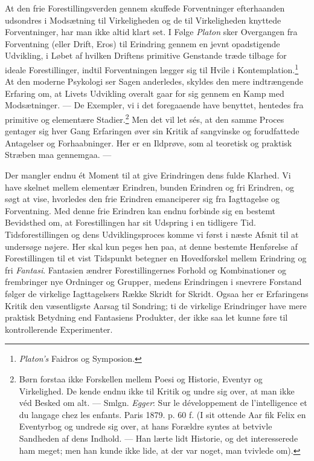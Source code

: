 \documentclass[12pt,a4paper,openany]{book}
\newcommand{\opage}[1]{\marginnote{\footnotesize\textit{[#1]}}}
\begin{document}
At den frie Forestillingsverden gennem skuffede Forventninger
efterhaanden udsondres i Modsætning til Virkeligheden og de til
Virkeligheden knyttede Forventninger, har man ikke altid klart set. I
Følge \emph{Platon} sker Overgangen fra Forventning (eller Drift, Eros)
til Erindring gennem en jevnt opadstigende Udvikling, i Løbet af hvilken
Driftens primitive Genstande træde tilbage for ideale Forestillinger,
indtil Forventningen lægger sig til Hvile i
Kontemplation.\footnote[1]{\emph{Platon’s} Faidros og Symposion.} At den
moderne Psykologi ser Sagen anderledes, skyldes den mere indtrængende
Erfaring om, at Livets Udvikling overalt gaar for sig gennem en Kamp med
Modsætninger. --- De Exempler, vi i det foregaaende have benyttet,
hentedes fra primitive og elementære Stadier.\footnote[2]{Børn forstaa
ikke Forskellen mellem Poesi og Historie, Eventyr og Virkelighed. De
kende endnu ikke til Kritik og undre sig over, at man ikke véd Besked om
alt. --- Smlgn. \emph{Egger}: Sur le développement de l’intelligence et
du langage chez les enfants. Paris 1879. p. 60 f. (I sit ottende Aar fik
Felix en Eventyrbog og undrede sig over, at hans Forældre syntes at
betvivle Sandheden af dens Indhold. --- Han lærte lidt Historie, og det
interesserede ham meget; men han kunde ikke lide, at der var noget, man
tvivlede om).} Men det vil let sés, at den samme
\opage{165}Proces gentager sig hver Gang Erfaringen øver sin Kritik af
sangvinske og forudfattede Antagelser og Forhaabninger. Her er en
Ildprøve, som al teoretisk og praktisk Stræben maa gennemgaa. ---

Der mangler endnu ét Moment til at give Erindringen dens fulde Klarhed.
Vi have skelnet mellem elementær Erindren, bunden Erindren og fri
Erindren, og søgt at vise, hvorledes den frie Erindren emanciperer sig
fra Iagttagelse og Forventning. Med denne frie Erindren kan endnu
forbinde sig en bestemt Bevidsthed om, at Forestillingen har sit
Udspring i en tidligere Tid. Tidsforestillingen og dens Udviklingsproces
komme vi først i næste Afsnit til at undersøge nøjere. Her skal kun
peges hen paa, at denne bestemte Henførelse af Forestillingen til et
vist Tidspunkt betegner en Hovedforskel mellem Erindring og fri
\emph{Fantasi}. Fantasien ændrer Forestillingernes Forhold og
Kombinationer og frembringer nye Ordninger og Grupper, medens
Erindringen i snevrere Forstand følger de virkelige Iagttagelsers Række
Skridt for Skridt. Ogsaa her er Erfaringens Kritik den væsentligste
Aarsag til Sondring; ti de virkelige Erindringer have mere praktisk
Betydning end Fantasiens Produkter, der ikke saa let kunne føre til
kontrollerende Experimenter.
\end{document}

